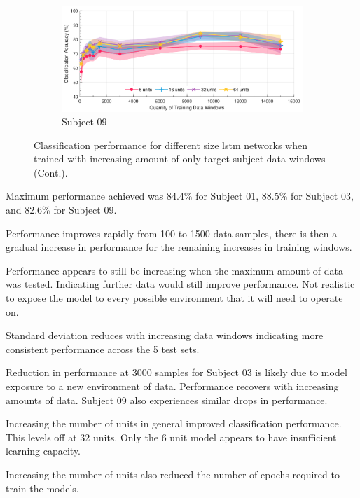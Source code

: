\begin{figure}[t]\ContinuedFloat
    \begin{subfigure}[b]{\textwidth}
        \centering
        \includegraphics[width=\textwidth]{content/5-Personalisation/Bespoke_Target/ch5_bespoke_target_model_subject_9.pdf}
        \caption{Subject 09}
        \label{fig:ch5_32_unit_bespoke_model}
    \end{subfigure}
    \caption[]{Classification performance for different size \acrshort{lstm} networks when trained with increasing amount of only target subject data windows (Cont.).}
\end{figure}

Maximum performance achieved was 84.4\% for Subject 01, 88.5\% for Subject 03, and 82.6\% for Subject 09.

Performance improves rapidly from 100 to 1500 data samples, there is then a gradual increase in performance for the remaining increases in training windows.

Performance appears to still be increasing when the maximum amount of data was tested. Indicating further data would still improve performance. Not realistic to expose the model to every possible environment that it will need to operate on.

Standard deviation reduces with increasing data windows indicating more consistent performance across the 5 test sets.

Reduction in performance at 3000 samples for Subject 03 is likely due to model exposure to a new environment of data. Performance recovers with increasing amounts of data. Subject 09 also experiences similar drops in performance.

Increasing the number of units in general improved classification performance. This levels off at 32 units. Only the 6 unit model appears to have insufficient learning capacity. 

Increasing the number of units also reduced the number of epochs required to train the models. 


